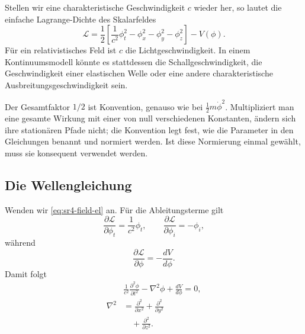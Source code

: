Stellen wir eine charakteristische Geschwindigkeit \(c\) wieder her, so lautet die einfache Lagrange-Dichte des Skalarfeldes \begin{equation}
\boxed{
\mathcal{L}
=
\frac12
\left[
\frac{1}{c^2}\phi_t^2
-\phi_x^2-\phi_y^2-\phi_z^2
\right]
-V(\phi)
}.
\label{eq:sr4-scalar-lagrangian}
\end{equation} Für ein relativistisches Feld ist \(c\) die Lichtgeschwindigkeit. In einem Kontinuumsmodell könnte es stattdessen die Schallgeschwindigkeit, die Geschwindigkeit einer elastischen Welle oder eine andere charakteristische Ausbreitungsgeschwindigkeit sein.

Der Gesamtfaktor \(1/2\) ist Konvention, genauso wie bei \(\tfrac12m\dot\phi^2\). Multipliziert man eine gesamte Wirkung mit einer von null verschiedenen Konstanten, ändern sich ihre stationären Pfade nicht; die Konvention legt fest, wie die Parameter in den Gleichungen benannt und normiert werden. Ist diese Normierung einmal gewählt, muss sie konsequent verwendet werden.

\begin{classroomqa}\end{classroomqa}

\subsection{Die Wellengleichung}

Wenden wir \eqref{eq:sr4-field-el} an. Für die Ableitungsterme gilt \begin{equation}
\frac{\partial\mathcal{L}}{\partial\phi_t}
=\frac{1}{c^2}\phi_t,
\qquad
\frac{\partial\mathcal{L}}{\partial\phi_i}
=-\phi_i,
\end{equation} während \begin{equation}
\frac{\partial\mathcal{L}}{\partial\phi}
=-\frac{dV}{d\phi}.
\end{equation} Damit folgt \begin{equation}
\begin{aligned}
&\boxed{
\frac{1}{c^2}\frac{\partial^2\phi}{\partial t^2}
-\nabla^2\phi
+\frac{dV}{d\phi}
=0
},\\[0.5em]
\nabla^2
&=
\frac{\partial^2}{\partial x^2}
+\frac{\partial^2}{\partial y^2}\\
&\quad
+\frac{\partial^2}{\partial z^2}.
\end{aligned}
\label{eq:sr4-general-scalar-eom}
\end{equation}

